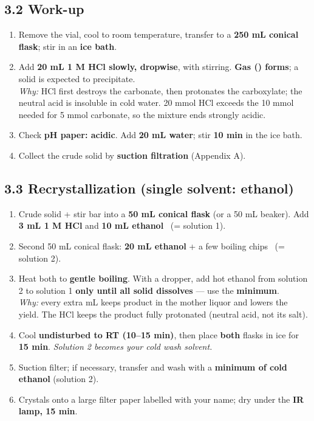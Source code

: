\documentclass[10pt,a4paper]{article}
\begin{document}
\subsection*{3.2 Work-up}
\begin{enumerate}[leftmargin=7mm,itemsep=1.2mm,label=\cbox\ \arabic*.,resume]
\item Remove the vial, cool to room temperature, transfer to a \textbf{250 mL conical flask}; stir in an \textbf{ice bath}.
\item Add \textbf{20 mL 1 M HCl slowly, dropwise}, with stirring. \textbf{Gas () forms}; a solid is expected to precipitate.\\
{\footnotesize \emph{Why:} HCl first destroys the carbonate, then protonates the carboxylate; the neutral acid is insoluble in cold water. 20 mmol HCl exceeds the 10 mmol needed for 5 mmol carbonate, so the mixture ends strongly acidic.}
\item Check \textbf{pH paper: acidic}. Add \textbf{20 mL water}; stir \textbf{10 min} in the ice bath.
\item Collect the crude solid by \textbf{suction filtration} (Appendix A).
\end{enumerate}

\subsection*{3.3 Recrystallization (single solvent: ethanol)}
\begin{enumerate}[leftmargin=7mm,itemsep=1.2mm,label=\cbox\ \arabic*.,resume]
\item Crude solid + stir bar into a \textbf{50 mL conical flask} (or a 50 mL beaker). Add \textbf{3 mL 1 M HCl} and \textbf{10 mL ethanol} \ (= solution 1).
\item Second 50 mL conical flask: \textbf{20 mL ethanol} + a few boiling chips \ (= solution 2).
\item Heat both to \textbf{gentle boiling}. With a dropper, add hot ethanol from solution 2 to solution 1 \textbf{only until all solid dissolves} --- use the \textbf{minimum}.\\
{\footnotesize \emph{Why:} every extra mL keeps product in the mother liquor and lowers the yield. The HCl keeps the product fully protonated (neutral acid, not its salt).}
\item Cool \textbf{undisturbed to RT (10--15 min)}, then place \textbf{both} flasks in ice for \textbf{15 min}. \emph{Solution 2 becomes your cold wash solvent.}
\item Suction filter; if necessary, transfer and wash with a \textbf{minimum of cold ethanol} (solution 2).
\item Crystals onto a large filter paper labelled with your name; dry under the \textbf{IR lamp, 15 min}.
\end{enumerate}
\end{document}
